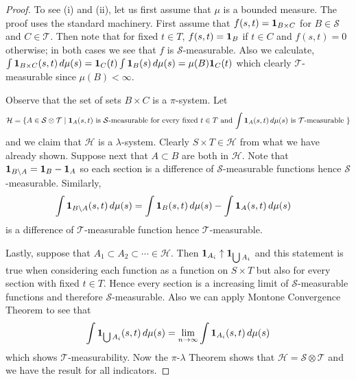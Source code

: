 \documentclass{amsart}
\theoremstyle{remark}
\theoremstyle{definition}
\begin{document}
\begin{proof}
To see (i) and (ii),  let us first assume that $\mu$ is a bounded measure.  The proof uses
the standard machinery.  First assume that $f(s,t)
= \textbf{1}_{B \times C}$ for $B \in \mathcal{S}$ and $C \in
\mathcal{T}$. Then note that for fixed $t \in T$, $f(s,t) = \textbf{1}_{B}$ if $t
\in C$ and $f(s,t) = 0$ otherwise; in both cases we see that $f$ is
$\mathcal{S}$-measurable.  Also we calculate, $\int \textbf{1}_{B
  \times C} (s,t) \,  d \mu(s) = \textbf{1}_{C} (t)\int
\textbf{1}_{B} (s) \,  d \mu(s) = \mu(B) \textbf{1}_{C} (t) $
which clearly $\mathcal{T}$-measurable since $\mu(B) < \infty$.

Observe that the set of sets $B \times C$ is a $\pi$-system.  Let
\begin{align*}
\mathcal{H} = \lbrace A \in \mathcal{S} \otimes \mathcal{T} \mid
\textbf{1}_{A}(s,t) \text{ is $\mathcal{S}$-measurable for every
  fixed $t \in T$ and $\int \textbf{1}_{A}(s,t) \, d\mu(s)$ is $\mathcal{T}$-measurable } \rbrace
\end{align*}
and we claim that $\mathcal{H}$ is a $\lambda$-system.  Clearly $S
\times T \in \mathcal{H}$ from what we have already shown.  Suppose
next that $A \subset B$ are both in $\mathcal{H}$.  Note that
$\textbf{1}_{B \setminus A} = \textbf{1}_{B} -
\textbf{1}_{A}$ so each section is a difference of
$\mathcal{S}$-measurable functions hence $\mathcal{S}$-measurable.
Similarly, 
\begin{align*}
\int \textbf{1}_{B \setminus A} (s,t) \, d\mu(s) &= \int
\textbf{1}_{B} (s,t) \, d\mu(s) - \int
\textbf{1}_{A} (s,t) \, d\mu(s) 
\end{align*}
is a difference of $\mathcal{T}$-measurable function hence
$\mathcal{T}$-measurable.

Lastly, suppose that $A_1 \subset A_2 \subset \cdots \in
\mathcal{H}$.  Then $\textbf{1}_{A_i} \uparrow \textbf{1}_{\bigcup A_i}$ and this statement is true when considering each
function as a function on $S \times T$ but also for every
section with fixed $t \in T$.  Hence every section is a increasing limit of $\mathcal{S}$-measurable
functions and therefore $\mathcal{S}$-measurable.  Also we can apply
Montone Convergence Theorem to see that 
\begin{align*}
\int \textbf{1}_{\bigcup A_i}(s,t) \, d\mu(s) = \lim_{n \to
  \infty} \int \textbf{1}_{A_i}(s,t) \, d\mu(s)
\end{align*}
which shows $\mathcal{T}$-measurability.
Now the
$\pi$-$\lambda$ Theorem shows that $\mathcal{H} =  \mathcal{S} \otimes
\mathcal{T}$ and we have the result for all indicators.  


\end{proof}
\end{document}
